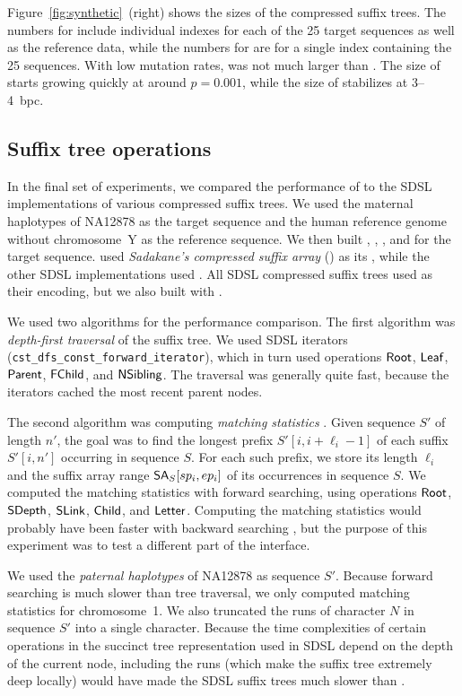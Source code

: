 Figure~\ref{fig:synthetic}~(right) shows the sizes of the compressed suffix
trees. The numbers for \RCST{} include individual indexes for each of the 25
target sequences as well as the reference data, while the numbers for \GCT{}
are for a single index containing the 25 sequences. With low mutation rates,
\RCST{} was not much larger than \GCT{}. The size of \RCST{} starts growing
quickly at around $p = 0.001$, while the size of \GCT{} stabilizes at
3\nobreakdash--4~bpc.

\subsection{Suffix tree operations}

In the final set of experiments, we compared the performance of \RCST{} to the
SDSL implementations of various compressed suffix trees. We used the maternal
haplotypes of NA12878 as the target sequence and the human reference genome
without chromosome~Y as the reference sequence. We then built \RCST, \CSTsada,
\CSTnpr, and \FCST{} for the target sequence. \CSTsada{} used \emph{Sadakane's
compressed suffix array} (\CSAsada) \cite{Sadakane2003} as its \CSA, while the
other SDSL implementations used \SSA. All SDSL compressed suffix trees used
\PLCP{} as their \LCP{} encoding, but we also built \CSTnpr{} with \LCPbyte.

We used two algorithms for the performance comparison. The first algorithm was
\emph{depth-first traversal} of the suffix tree. We used SDSL iterators
(\texttt{cst\_dfs\_const\_forward\_iterator}), which in turn used operations
$\mathsf{Root}$, $\mathsf{Leaf}$, $\mathsf{Parent}$, $\mathsf{FChild}$, and $\mathsf{NSibling}$. The traversal
was generally quite fast, because the iterators cached the most recent parent
nodes.

The second algorithm was computing \emph{matching statistics}
\cite{Chang1994}. Given sequence $S'$ of length $n'$, the goal was to find the
longest prefix $S'[i,i+\ell_{i}-1]$ of each suffix $S'[i,n']$ occurring in
sequence $S$. For each such prefix, we store its length $\ell_{i}$ and the
suffix array range $\mathsf{SA}_{S}[sp_{i},ep_{i}]$ of its occurrences in sequence
$S$. We computed the matching statistics with forward searching, using
operations $\mathsf{Root}$, $\mathsf{SDepth}$, $\mathsf{SLink}$, $\mathsf{Child}$, and $\mathsf{Letter}$.
Computing the matching statistics would probably have been faster with
backward searching \cite{Ohlebusch2010a}, but the purpose of this experiment
was to test a different part of the interface.

We used the \emph{paternal haplotypes} of NA12878 as sequence $S'$. Because
forward searching is much slower than tree traversal, we only computed
matching statistics for chromosome~1. We also truncated the runs of character
$N$ in sequence $S'$ into a single character. Because the time complexities of
certain operations in the succinct tree representation used in SDSL depend on
the depth of the current node, including the runs (which make the suffix tree
extremely deep locally) would have made the SDSL suffix trees much slower than
\RCST.

